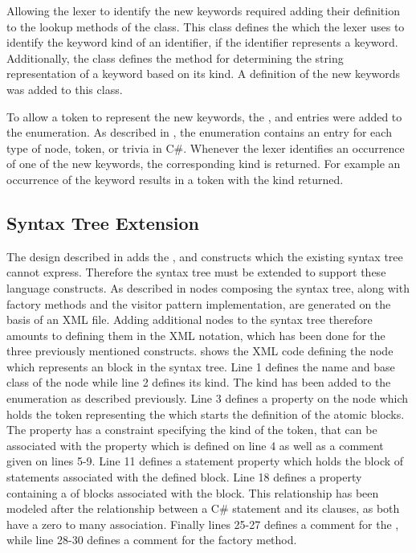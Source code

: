 Allowing the lexer to identify the new keywords required adding their definition to the lookup methods of the  class. This class defines the  which the lexer uses to identify the keyword kind of an identifier, if the identifier represents a keyword. Additionally, the  class defines the  method for determining the string representation of a keyword based on its kind. A definition of the new keywords was added to this class.

To allow a token to represent the new keywords, the ,  and  entries were added to the  enumeration. As described in , the  enumeration contains an entry for each type of node, token, or trivia in C\#. Whenever the lexer identifies an occurrence of one of the new keywords, the corresponding kind is  returned. For example an occurrence of the  keyword results in a token with the kind  returned.

\subsection{Syntax Tree Extension}
The design described in  adds the ,  and  constructs which the existing syntax tree cannot express. Therefore the syntax tree must be extended to support these language constructs. As described in  nodes composing the syntax tree, along with factory methods and the visitor pattern implementation, are generated on the basis of an \ac{XML} file. Adding additional nodes to the syntax tree therefore amounts to defining them in the \ac{XML} notation, which has been done for the three previously mentioned constructs.  shows the \ac{XML} code defining the  node which represents an  block in the syntax tree. Line 1 defines the name and base class of the node while line 2 defines its kind. The  kind has been added to the  enumeration as described previously. Line 3 defines a property on the node which holds the token representing the  which starts the definition of the atomic blocks. The property has a constraint specifying the kind of the token, that can be associated with the property which is defined on line 4 as well as a comment given on lines 5-9. Line 11 defines a statement property which holds the block of statements associated with the defined  block. Line 18 defines a property containing a  of  blocks associated with the  block. This relationship has been modeled after the relationship between a C\#  statement and its  clauses, as both have a zero to many association. Finally lines 25-27 defines a comment for the , while line 28-30 defines a comment for the factory method.

